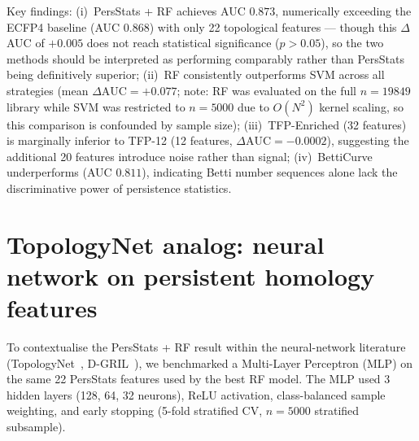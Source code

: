 \documentclass[11pt,a4paper]{article}
\begin{document}
Key findings: (i)~PersStats + RF achieves AUC $0.873$, numerically exceeding the ECFP4 baseline (AUC $0.868$) with only 22 topological features --- though this $\Delta$AUC of $+0.005$ does not reach statistical significance ($p > 0.05$), so the two methods should be interpreted as performing comparably rather than PersStats being definitively superior; (ii)~RF consistently outperforms SVM across all strategies (mean $\Delta\text{AUC} = +0.077$; note: RF was evaluated on the full $n = 19849$ library while SVM was restricted to $n = 5000$ due to $O(N^2)$ kernel scaling, so this comparison is confounded by sample size); (iii)~TFP-Enriched (32 features) is marginally inferior to TFP-12 (12 features, $\Delta\text{AUC} = -0.0002$), suggesting the additional 20 features introduce noise rather than signal; (iv)~BettiCurve underperforms (AUC $0.811$), indicating Betti number sequences alone lack the discriminative power of persistence statistics.


\section{TopologyNet analog: neural network on persistent homology features}
\label{sec:topologynet_analog}

To contextualise the PersStats + RF result within the neural-network literature (TopologyNet~\citep{topologynet_2018}, D-GRIL~\citep{dgril_2026}), we benchmarked a Multi-Layer Perceptron (MLP) on the same 22 PersStats features used by the best RF model. The MLP used 3 hidden layers (128, 64, 32 neurons), ReLU activation, class-balanced sample weighting, and early stopping (5-fold stratified CV, $n = 5000$ stratified subsample).
\end{document}
